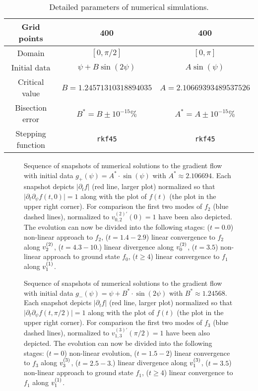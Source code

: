 \begin{table}[ht]
  \centering
  \begin{tabular}{|c|c|c|}\hline
    Grid points       & 400                          & 400                        \\\hline
    Domain            & $[0,\pi/2]$                  & $[0,\pi]$                  \\\hline
    Initial data      & $\psi+B\sin(2\psi)$          & $A\sin(\psi)$              \\\hline
    Critical value    & $B=1.24571310318894035$ & $A=2.10669393489537526$ \\\hline
    Bisection error   & $B^*=B\pm10^{-15}\%$          & $A^*=A\pm10^{-15}\%$       \\\hline
    Stepping function & \verb|rkf45|                 & \verb|rkf45|               \\\hline
  \end{tabular}
  \caption{Detailed parameters of numerical simulations.}
  \label{tab:num_details}
\end{table}


\begin{figure}[h]
  \centering \advance\leftskip-3cm
  
  \caption{Sequence of snapshots of numerical solutions to the
    gradient flow with initial data $g_+(\psi)=A^*\cdot \sin(\psi)$
    with $A^*\approx2.106694$. Each snapshot depicts
    $\lvert \partial_t f\rvert$ (red line, larger plot) normalized so
    that $\lvert \partial_t\partial_\psi f(t,0)\rvert=1$ along with the
    plot of $f(t)$ (the plot in the upper right corner). For
    comparison the first two modes of $f_2$ (blue dashed lines),
    normalized to $v_{0,2}^{(2)\prime}(0)=1$ have been also
    depicted. The evolution can now be divided into the following
    stages: ($t=0.0$) non-linear approach to $f_2$, ($t=1.4-2.9$)
    linear convergence to $f_2$ along $v_{2}^{(2)}$, ($t=4.3-10.$)
    linear divergence along $v_{0}^{(2)}$, ($t=3.5$) non-linear approach
    to ground state $f_0$, ($t\ge4$) linear convergence to $f_1$ along
    $v_{1}^{(1)}$.}\label{fig:snapshot_f2}
\end{figure}

\begin{figure}[h]
  \centering \advance\leftskip-3cm
  
  \caption{Sequence of snapshots of numerical solutions to the
    gradient flow with initial data $g_-(\psi)=\psi+B^*\cdot
    \sin(2\psi)$ with $B^*\approx1.24568$. Each snapshot depicts
    $\lvert \partial_t f\rvert$ (red line, larger plot) normalized so
    that $\lvert \partial_t\partial_\psi f(t,\pi/2)\rvert=1$ along with
    the plot of $f(t)$ (the plot in the upper right corner). For
    comparison the first two modes of $f_3$ (blue dashed lines),
    normalized to $v_{1,3}^{(3)\prime}(\pi/2)=1$ have been also
    depicted. The evolution can now be divided into the following
    stages: ($t=0$) non-linear evolution, ($t=1.5-2$) linear
    convergence to $f_3$ along $v_{3}^{(3)}$, ($t=2.5-3.$) linear
    divergence along $v_{1}^{(3)}$, ($t=3.5$) non-linear approach to
    ground state $f_1$, ($t\ge4$) linear convergence to $f_1$ along
    $v_{1}^{(1)}$.}\label{fig:snapshot_f3}
\end{figure}

